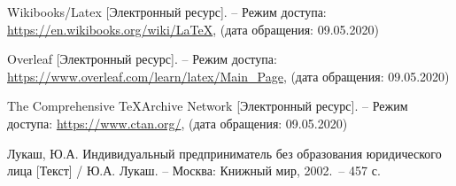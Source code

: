 \begin{thebibliography}{00}

    Wikibooks/Latex
    [Электронный ресурс]. – Режим доступа:
    \url{https://en.wikibooks.org/wiki/LaTeX},
    (дата обращения: 09.05.2020)

    Overleaf
    [Электронный ресурс]. – Режим доступа:
    \url{https://www.overleaf.com/learn/latex/Main\_Page},
    (дата обращения: 09.05.2020)

    The Comprehensive \TeX{}Archive Network
    [Электронный ресурс]. – Режим доступа:
    \url{https://www.ctan.org/},
    (дата обращения: 09.05.2020)

    Лукаш, Ю.А. Индивидуальный предприниматель без 
    образования юридического лица 
    [Текст] / Ю.А. Лукаш. – Москва:
    Книжный мир, 2002.~– 457 с. 
    
\setcounter{bibitems}{\value{enumiv}}
\end{thebibliography}
